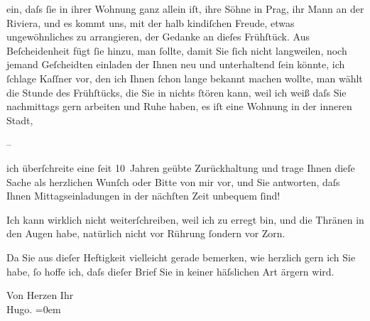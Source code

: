                ein, daſs ſie in ihrer Wohnung {\pb}ganz allein iſt, ihre Söhne in Prag, ihr Mann an der Riviera, und es kommt uns, mit der halb
               kindiſchen Freude, etwas ungewöhnliches zu arrangieren, der Gedanke an dieſes
               Frühſtück. Aus Beſcheidenheit fügt ſie hinzu, man ſollte, damit Sie ſich nicht
               langweilen, noch {\pb}jemand
               Geſcheidten einladen der Ihnen neu und unterhaltend ſein könnte, ich ſchlage Kaſſner vor, den ich Ihnen ſchon lange bekannt
               machen wollte, man wählt die Stunde des Frühſtücks, die Sie in nichts ſtören kann,
               weil {\pb}ich weiß daſs Sie
               nachmittags gern arbeiten und Ruhe haben, es iſt eine Wohnung in der inneren Stadt,\pend
           
\pstart
           \numberlinefalse{}–\numberlinetrue{}\pend
           
\pstart
           ich überſchreite eine ſeit 10 Jahren geübte Zurückhaltung und trage Ihnen dieſe Sache
               als herzlichen Wunſch oder Bitte von {\pb}mir vor, und Sie antworten, daſs
               Ihnen Mittagseinladungen in der nächſten Zeit unbequem ſind!\pend
           
\pstart
           Ich kann wirklich nicht weiterſchreiben, weil ich zu erregt bin, und die Thränen in
               den Augen {\pb}habe, natürlich nicht
               vor Rührung ſondern vor Zorn.\pend
           
\pstart
           Da Sie aus dieſer Heftigkeit vielleicht gerade bemerken, wie herzlich gern ich Sie
               habe, ſo hoffe ich, daſs dieſer Brief Sie in keiner häſslichen Art ärgern wird.\pend
           
\pstart
           Von Herzen Ihr{\\[\baselineskip]}\spacefill\mbox{Hugo.}\pend
           \leftskip=0em{}\endnumbering{}  
      